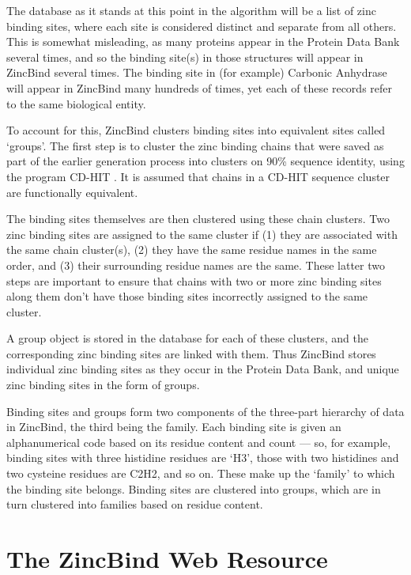 The database as it stands at this point in the algorithm will be a list of zinc binding sites, where each site is considered distinct and separate from all others. This is somewhat misleading, as many proteins appear in the Protein Data Bank several times, and so the binding site(s) in those structures will appear in ZincBind several times. The binding site in (for example) Carbonic Anhydrase will appear in ZincBind many hundreds of times, yet each of these records refer to the same biological entity.

To account for this, ZincBind clusters binding sites into equivalent sites called `groups'. The first step is to cluster the zinc binding chains that were saved as part of the earlier generation process into clusters on 90\% sequence identity, using the program CD-HIT \cite{li2006cdhit}. It is assumed that chains in a CD-HIT sequence cluster are functionally equivalent.

The binding sites themselves are then clustered using these chain clusters. Two zinc binding sites are assigned to the same cluster if (1) they are associated with the same chain cluster(s), (2) they have the same residue names in the same order, and (3) their surrounding residue names are the same. These latter two steps are important to ensure that chains with two or more zinc binding sites along them don't have those binding sites incorrectly assigned to the same cluster.

A group object is stored in the database for each of these clusters, and the corresponding zinc binding sites are linked with them. Thus ZincBind stores individual zinc binding sites as they occur in the Protein Data Bank, and unique zinc binding sites in the form of groups.

Binding sites and groups form two components of the three-part hierarchy of data in ZincBind, the third being the family. Each binding site is given an alphanumerical code based on its residue content and count --- so, for example, binding sites with three histidine residues are `H3', those with two histidines and two cysteine residues are C2H2, and so on. These make up the `family' to which the binding site belongs. Binding sites are clustered into groups, which are in turn clustered into families based on residue content.

\section{The ZincBind Web Resource}

